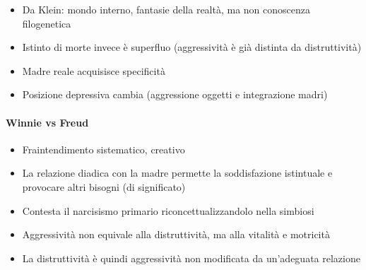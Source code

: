 \documentclass[12pt, a4paper]{article}
\begin{document}
\begin{itemize}
    \item Da Klein: mondo interno, fantasie della realt\`a, ma non conoscenza filogenetica
    \item Istinto di morte invece \`e superfluo (aggressivit\`a \`e gi\`a distinta da distruttivit\`a)
    \item Madre reale acquisisce specificit\`a
    \item Posizione depressiva cambia (aggressione oggetti e integrazione madri)
\end{itemize}

\paragraph{Winnie vs Freud}

\begin{itemize}
    \item Fraintendimento sistematico, creativo
    \item La relazione diadica con la madre permette la soddisfazione istintuale e provocare altri bisogni (di significato)
    \item Contesta il narcisismo primario riconcettualizzandolo nella simbiosi
    \item Aggressivit\`a non equivale alla distruttivit\`a, ma alla vitalit\`a e motricit\`a
    \item La distruttivit\`a \`e quindi aggressivit\`a non modificata da un'adeguata relazione
\end{itemize}
\end{document}
